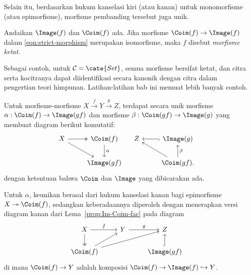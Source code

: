 Selain itu, berdasarkan hukum kanselasi kiri (atau kanan) untuk monomorfisme
(atau epimorfisme), morfisme pembanding tersebut juga unik.

\begin{definisi}\label{def:strict-morphism}
	Andaikan $\Image(f)$ dan $\Coim(f)$ ada. Jika morfisme
	$\Coim(f) \to \Image(f)$ dalam \eqref{eqn:strict-morphism} merupakan
	isomorfisme, maka $f$ disebut \emph{morfisme ketat}.
\end{definisi}

Sebagai contoh, untuk $\mathcal{C} = \cate{Set}$, semua morfisme bersifat
ketat, dan citra serta kocitranya dapat diidentifikasi secara kanonik
dengan citra dalam pengertian teori himpunan. Latihan-latihan bab ini memuat
lebih banyak contoh.

\begin{proposisi}\label{prop:Images-f-gf}
	Untuk morfisme-morfisme $X \xrightarrow{f} Y \xrightarrow{g} Z$,
	terdapat secara unik morfisme $\alpha: \Coim(f) \to \Image(gf)$ dan
	morfisme $\beta: \Coim(gf) \to \Image(g)$ yang membuat diagram berikut
	komutatif:
	\[\begin{tikzcd}
		X \arrow[twoheadrightarrow, r] \arrow[rd] & \Coim(f) \arrow[d, "\alpha"] \\
		& \Image(gf)
	\end{tikzcd} \quad \begin{tikzcd}
		Z & \Image(g) \arrow[hookrightarrow, l] \\
		& \Coim(gf) \arrow[u, "\beta"'] \arrow[lu].
	\end{tikzcd}\]
	dengan ketentuan bahwa $\Coim$ dan $\Image$ yang dibicarakan ada.
\end{proposisi}

\begin{bukti}
	Untuk $\alpha$, keunikan berasal dari hukum kanselasi kanan bagi
	epimorfisme $X \twoheadrightarrow \Coim(f)$, sedangkan keberadaannya
	diperoleh dengan menerapkan versi diagram kanan dari
	Lema~\ref{prop:Im-Coim-fac} pada diagram
	\[\begin{tikzcd}
		X \arrow[r, "f"] \arrow[twoheadrightarrow, d] & Y \arrow[r, "g"] & Z \\
		\Coim(f) \arrow[ru] \arrow[rru] & & \Image(gf) \arrow[hookrightarrow, u]
	\end{tikzcd}\]
	di mana $\Coim(f) \to Y$ adalah komposisi
	$\Coim(f) \to \Image(f) \hookrightarrow Y$.
\end{bukti}

